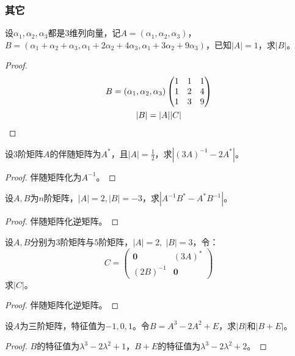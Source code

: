 \subsubsection{其它}
\begin{theorem}
	设$\alpha_1,\alpha_2,\alpha_3$都是$3$维列向量，记$A=(\alpha_1,\alpha_2,\alpha_3)$，$B=(\alpha_1+\alpha_2+\alpha_3,\alpha_1+2\alpha_2+4\alpha_3,\alpha_1+3\alpha_2+9\alpha_3)$，已知$|A|=1$，求$|B|$。
\end{theorem}
\begin{proof}
	\begin{gather*}
		B=(\alpha_1,\alpha_2,\alpha_3)
		\begin{pmatrix}
			1 & 1 & 1 \\
			1 & 2 & 4 \\
			1 & 3 & 9
		\end{pmatrix} \\
		|B|=|A||C|\qedhere
	\end{gather*}
\end{proof}
\begin{theorem}
	设$3$阶矩阵$A$的伴随矩阵为$A^*$，且$|A|=\frac{1}{2}$，求$|(3A)^{-1}-2A^*|$。
\end{theorem}
\begin{proof}
	伴随矩阵化为$A^{-1}$。
\end{proof}
\begin{theorem}
	设$A,B$为$n$阶矩阵，$|A|=2,|B|=-3$，求$|A^{-1}B^*-A^*B^{-1}|$。
\end{theorem}
\begin{proof}
	伴随矩阵化逆矩阵。
\end{proof}
\begin{theorem}
	设$A,B$分别为$3$阶矩阵与$5$阶矩阵，$|A|=2,\;|B|=3$，令：
	\begin{equation*}
		C=
		\begin{pmatrix}
			\mathbf{0} & (3A)^* \\
			(2B)^{-1} & \mathbf{0}
		\end{pmatrix}
	\end{equation*}
	求$|C|$。
\end{theorem}
\begin{proof}
	伴随矩阵化逆矩阵。
\end{proof}
\begin{theorem}
	设$A$为三阶矩阵，特征值为$-1,0,1$。令$B=A^3-2A^2+E$，求$|B|$和$|B+E|$。
\end{theorem}
\begin{proof}
	$B$的特征值为$\lambda^3-2\lambda^2+1$，$B+E$的特征值为$\lambda^3-2\lambda^2+2$。
\end{proof}
